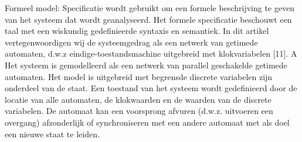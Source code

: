 \documentclass{article}
\begin{document}
	
 
%	
%	
%	
	
	
	Formeel model: Specificatie wordt gebruikt om een formele beschrijving te geven
	van het systeem dat wordt geanalyseerd. Het formele
	specificatie beschouwt een taal met een wiskundig gedefinieerde
	syntaxis en semantiek. In dit artikel vertegenwoordigen wij de
	systeemgedrag als een netwerk van getimede automaten, d.w.z
	eindige-toestandsmachine uitgebreid met klokvariabelen [11]. A
	Het systeem is gemodelleerd als een netwerk van parallel geschakelde getimede automaten.
	Het model is uitgebreid met begrensde discrete variabelen
	zijn onderdeel van de staat. Een toestand van het systeem wordt gedefinieerd door de
	locatie van alle automaten, de klokwaarden en de waarden van de
	discrete variabelen. De automaat kan een voorsprong afvuren (d.w.z. uitvoeren
	een overgang) afzonderlijk of synchroniseren met een andere automaat
	met als doel een nieuwe staat te leiden.
	
\end{document}
